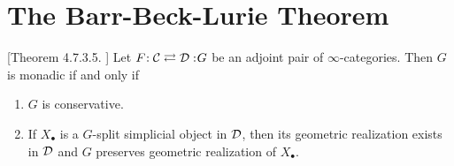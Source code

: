 \section{The Barr-Beck-Lurie Theorem}
\begin{theorem}
\label{Barr-Beck-Lurie theorem}
	[Theorem 4.7.3.5. \cite{HA}]
	Let $F\negmedspace: {\mathcal{C}}\rightleftarrows {\mathcal{D}}:\negmedspace G$ be an adjoint pair of $\infty$-categories. Then $G$ is monadic if and only if 
	\begin{enumerate}
		\item $G$ is conservative.
		\item If $X_\bullet$ is a $G$-split simplicial object in ${\mathcal{D}}$, then its geometric realization exists in ${\mathcal{D}}$ and $G$ preserves geometric realization of $X_{\bullet}$.
	\end{enumerate}
\end{theorem}

